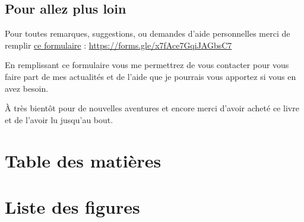\documentclass[11pt]{article}
\begin{document}
\subsection{Pour allez plus loin}
\label{sec:org815137e}


Pour toutes remarques, suggestions, ou demandes d'aide personnelles
merci de remplir \href{https://forms.gle/x7fAce7GqiJAGbsC7}{ce formulaire} : \url{https://forms.gle/x7fAce7GqiJAGbsC7}


En remplissant ce formulaire vous me permettrez de vous contacter pour
vous faire part de mes actualités et de l'aide que je pourrais vous
apportez si vous en avez besoin.


À très bientôt pour de nouvelles aventures et encore merci d'avoir
acheté ce livre et de l'avoir lu jusqu'au bout.


\newpage


\section{Table des matières}
\label{sec:org0c60518}

\setcounter{tocdepth}{3}
\tableofcontents

\section{Liste des figures}
\label{sec:orgbf11a75}

\listoffigures
\end{document}
